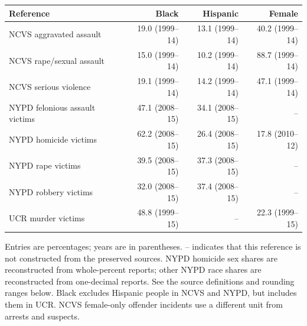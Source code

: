 \begin{center}
\label{tab:victim_references}
\small\setlength{\tabcolsep}{4pt}\renewcommand{\arraystretch}{1.25}
\begin{tabular}{@{}>{\raggedright\arraybackslash}p{.38\linewidth}rrr@{}}
\toprule Reference & Black & Hispanic & Female \\
\midrule
NCVS aggravated assault & 19.0 {\scriptsize (1999--14)} & 13.1 {\scriptsize (1999--14)} & 40.2 {\scriptsize (1999--14)} \\
NCVS rape/sexual assault & 15.0 {\scriptsize (1999--14)} & 10.2 {\scriptsize (1999--14)} & 88.7 {\scriptsize (1999--14)} \\
NCVS serious violence & 19.1 {\scriptsize (1999--14)} & 14.2 {\scriptsize (1999--14)} & 47.1 {\scriptsize (1999--14)} \\
NYPD felonious assault victims & 47.1 {\scriptsize (2008--15)} & 34.1 {\scriptsize (2008--15)} & -- \\
NYPD homicide victims & 62.2 {\scriptsize (2008--15)} & 26.4 {\scriptsize (2008--15)} & 17.8 {\scriptsize (2010--12)} \\
NYPD rape victims & 39.5 {\scriptsize (2008--15)} & 37.3 {\scriptsize (2008--15)} & -- \\
NYPD robbery victims & 32.0 {\scriptsize (2008--15)} & 37.4 {\scriptsize (2008--15)} & -- \\
UCR murder victims & 48.8 {\scriptsize (1999--15)} & -- & 22.3 {\scriptsize (1999--15)} \\
\bottomrule\end{tabular}
\par\smallskip
\parbox{\linewidth}{\footnotesize\raggedright Entries are percentages; years are in parentheses.
-- indicates that this reference is not constructed from the preserved sources.
NYPD homicide sex shares are reconstructed from whole-percent reports; other NYPD race shares
are reconstructed from one-decimal reports. See the source definitions and rounding ranges below.
Black excludes Hispanic people in NCVS and NYPD, but includes them in UCR.
NCVS female-only offender incidents use a different unit from arrests and suspects.}
\end{center}

